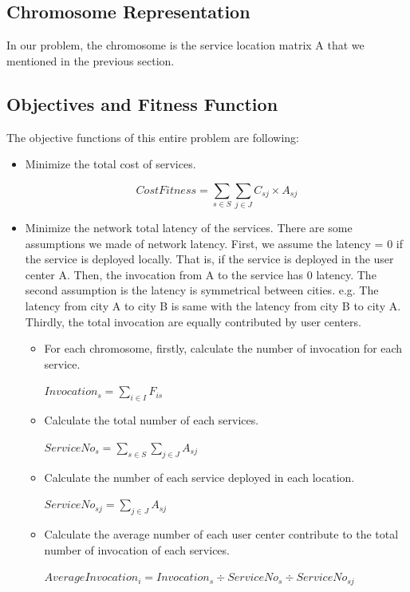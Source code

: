 \documentclass{llncs}
\begin{document}
\subsection{Chromosome Representation}
In our problem, the chromosome is the service location matrix A that we mentioned in the previous section. 
\subsection{Objectives and Fitness Function}
The objective functions of this entire problem are following:
\begin{itemize}
	\item Minimize the total cost of services. 
		\begin{center}
			\begin{equation}
				CostFitness = \sum\limits_{s \in S} \sum\limits_{j \in J} C_{sj} \times A_{sj}
			\end{equation}
		\end{center}
	\item Minimize the network total latency of the services. There are some assumptions we made of network latency. First, we assume
			the latency = 0 if the service is deployed locally. That is, if the service is deployed in the user center A. Then, the 
			invocation from A to the service has 0 latency. The second assumption is the latency is symmetrical between cities. e.g. 
			The latency from city A to city B is same with the latency from city B to city A. Thirdly, the total invocation are equally
			contributed by user centers.
		\begin{itemize}
			\item For each chromosome, firstly, calculate the number of invocation for each service.
				\begin{center}
					$Invocation_{s} = \sum\limits_{i \in I} F_{is}$
				\end{center}
			\item Calculate the total number of each services.
				\begin{center}
					$ServiceNo_{s} = \sum\limits_{s \in S}\sum\limits_{j \in J} A_{sj}$
				\end{center}
			\item Calculate the number of each service deployed in each location.
				\begin{center}
					$ServiceNo_{sj} = \sum\limits_{j \in J} A_{sj}$
				\end{center}
			\item Calculate the average number of each user center contribute to the total number of invocation of each services.
				\begin{center}
					$AverageInvocation_{i} = Invocation_{s} \div ServiceNo_{s} \div ServiceNo_{sj}$
				\end{center}


\end{itemize}
\end{itemize}
\end{document}
